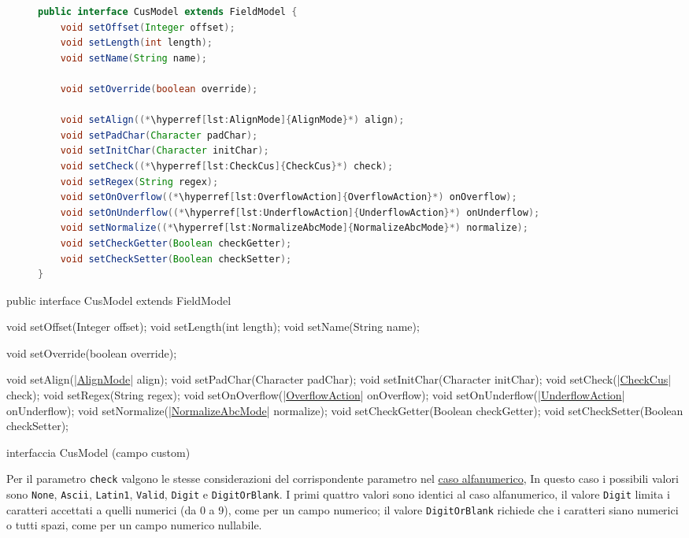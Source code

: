 \ifesource
\begin{figure*}[!htb]
\begin{lstlisting}[language=java, 
caption=interfaccia CusModel (campo custom), 
label=lst:CusModel]
public interface CusModel extends FieldModel {
    void setOffset(Integer offset);
    void setLength(int length);
    void setName(String name);
    
    void setOverride(boolean override);
    
    void setAlign((*\hyperref[lst:AlignMode]{AlignMode}*) align);
    void setPadChar(Character padChar);
    void setInitChar(Character initChar);
    void setCheck((*\hyperref[lst:CheckCus]{CheckCus}*) check);
    void setRegex(String regex);
    void setOnOverflow((*\hyperref[lst:OverflowAction]{OverflowAction}*) onOverflow);
    void setOnUnderflow((*\hyperref[lst:UnderflowAction]{UnderflowAction}*) onUnderflow);
    void setNormalize((*\hyperref[lst:NormalizeAbcMode]{NormalizeAbcMode}*) normalize);
    void setCheckGetter(Boolean checkGetter);
    void setCheckSetter(Boolean checkSetter);
}
\end{lstlisting}
\end{figure*}
\else
\begin{elisting}[!htb]
\begin{javacode}
public interface CusModel extends FieldModel {
    void setOffset(Integer offset);
    void setLength(int length);
    void setName(String name);
    
    void setOverride(boolean override);
    
    void setAlign(|\hyperref[lst:AlignMode]{AlignMode}| align);
    void setPadChar(Character padChar);
    void setInitChar(Character initChar);
    void setCheck(|\hyperref[lst:CheckCus]{CheckCus}| check);
    void setRegex(String regex);
    void setOnOverflow(|\hyperref[lst:OverflowAction]{OverflowAction}| onOverflow);
    void setOnUnderflow(|\hyperref[lst:UnderflowAction]{UnderflowAction}| onUnderflow);
    void setNormalize(|\hyperref[lst:NormalizeAbcMode]{NormalizeAbcMode}| normalize);
    void setCheckGetter(Boolean checkGetter);
    void setCheckSetter(Boolean checkSetter);
}
\end{javacode}
\caption{interfaccia CusModel (campo custom)}
\label{lst:CusModel}
\end{elisting}
\fi

Per il parametro \verb!check! valgono le stesse considerazioni del 
corrispondente parametro nel \hyperlink{abc:chk}{caso alfanumerico},
In questo caso i possibili valori sono \verb!None!, \verb!Ascii!, \verb!Latin1!, 
\verb!Valid!, \verb!Digit! e \verb!DigitOrBlank!.
I primi quattro valori sono identici al caso alfanumerico, il valore 
\verb!Digit! limita i caratteri accettati a quelli numerici (da 0 a 9), come
per un campo numerico; il valore \verb!DigitOrBlank! richiede che i caratteri
siano numerici o tutti spazi, come per un campo numerico nullabile.

